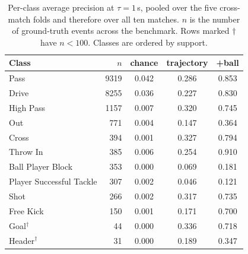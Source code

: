 \begin{table}[t]
  \centering
  \caption{Per-class average precision at $\tau = 1\,$s, pooled over the five cross-match folds and therefore over all ten matches. $n$ is the number of ground-truth events across the benchmark. Rows marked $\dagger$ have $n < 100$. Classes are ordered by support.}
  \label{tab:bas_per_class}
  \small
  \begin{tabular}{lrccc}
    \toprule
    Class & $n$ & chance & trajectory & {+}ball \\
    \midrule
    Pass & 9319 & 0.042 & 0.286 & 0.853 \\
    Drive & 8255 & 0.036 & 0.227 & 0.830 \\
    High Pass & 1157 & 0.007 & 0.320 & 0.745 \\
    Out & 771 & 0.004 & 0.147 & 0.364 \\
    Cross & 394 & 0.001 & 0.327 & 0.794 \\
    Throw In & 385 & 0.006 & 0.254 & 0.910 \\
    Ball Player Block & 353 & 0.000 & 0.069 & 0.181 \\
    Player Successful Tackle & 307 & 0.002 & 0.046 & 0.121 \\
    Shot & 266 & 0.002 & 0.317 & 0.735 \\
    Free Kick & 150 & 0.001 & 0.171 & 0.700 \\
    Goal$^\dagger$ & 44 & 0.000 & 0.336 & 0.718 \\
    Header$^\dagger$ & 31 & 0.000 & 0.189 & 0.347 \\
    \bottomrule
  \end{tabular}
\end{table}
